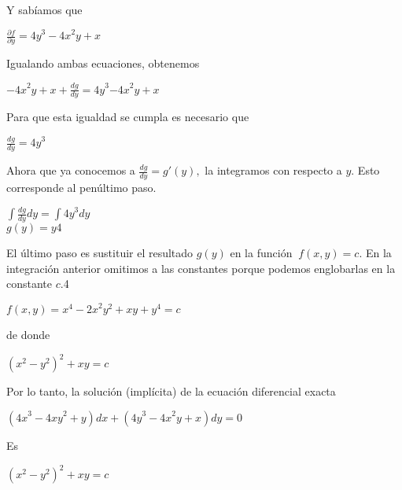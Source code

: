 \documentclass[l etterpaper,11pt]{article}
\begin{document}
Y sabíamos que
\begin{center}

$\frac{\partial f}{\partial y}={4y}^3-{4x}^2y+x$\\
\end{center}

Igualando ambas ecuaciones, obtenemos
\begin{center}

${-4x}^2y+x+\frac{dg}{dy}={4y}^3{-4x}^2y+x$\\
\end{center}

Para que esta igualdad se cumpla es necesario que
\begin{center}

$\frac{dg}{dy}={4y}^3$\\
\end{center}

Ahora que ya conocemos a $  \frac{dg}{dy}=g\prime(y), $ la integramos con respecto a $y$. Esto corresponde al penúltimo paso.
\begin{center}

$\int\frac{dg}{dy}dy=\int{4y}^3dy$\\
$g(y)=y4$\\
\end{center}

El último paso es sustituir el resultado $ g(y) $ en la función $\ f(x,y)=c.$  En la integración anterior omitimos a las constantes porque podemos englobarlas en la constante $c.$4
\begin{center}

$f(x,y)=x^4-{2x}^2y^2+xy+y^4=c$\\
\end{center}

de donde
\begin{center}

${(x^2-y^2)}^2+xy=c$\\
\end{center}

Por lo tanto, la solución (implícita) de la ecuación diferencial exacta
\begin{center}

$({4x}^3-{4xy}^2+y)dx+({4y}^3-{4x}^2y+x)dy=0$\\
\end{center}

Es
\begin{center}

${(x^2-y^2)}^2+xy=c$\\
\end{center}
\end{document}
